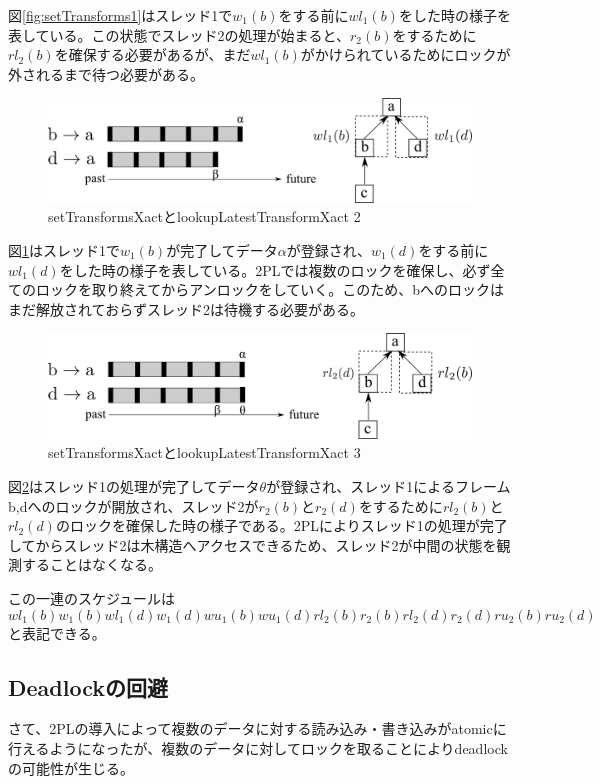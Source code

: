 \documentclass[a4paper]{jreport}	%
\begin{document}
図\ref{fig:setTransforms1}はスレッド1で$w_1(b)$をする前に$wl_1(b)$をした時の様子を表している。この状態でスレッド2の処理が始まると、$r_2(b)$をするために$rl_2(b)$を確保する必要があるが、まだ$wl_1(b)$がかけられているためにロックが外されるまで待つ必要がある。

\begin{figure}[h] 
\centering
\includegraphics[width=12cm]{setTransforms2}
\caption{setTransformsXactとlookupLatestTransformXact 2}
\label{fig:setTransforms2}
\end{figure}

図\ref{fig:setTransforms2}はスレッド1で$w_1(b)$が完了してデータ$\alpha$が登録され、$w_1(d)$をする前に$wl_1(d)$をした時の様子を表している。2PLでは複数のロックを確保し、必ず全てのロックを取り終えてからアンロックをしていく。このため、bへのロックはまだ解放されておらずスレッド2は待機する必要がある。


\begin{figure}[h] 
\centering
\includegraphics[width=12cm]{setTransforms3}
\caption{setTransformsXactとlookupLatestTransformXact 3}
\label{fig:setTransforms3}
\end{figure}


図\ref{fig:setTransforms3}はスレッド1の処理が完了してデータ$\theta$が登録され、スレッド1によるフレームb,dへのロックが開放され、スレッド2が$r_2(b)$と$r_2(d)$をするために$rl_2(b)$と$rl_2(d)$のロックを確保した時の様子である。2PLによりスレッド1の処理が完了してからスレッド2は木構造へアクセスできるため、スレッド2が中間の状態を観測することはなくなる。

この一連のスケジュールは
\begin{equation}
	wl_1(b)w_1(b)wl_1(d)w_1(d)wu_1(b)wu_1(d)rl_2(b)r_2(b)rl_2(d)r_2(d)ru_2(b)ru_2(d)
\end{equation}
と表記できる。

\subsection{Deadlockの回避}
さて、2PLの導入によって複数のデータに対する読み込み・書き込みがatomicに行えるようになったが、複数のデータに対してロックを取ることによりdeadlockの可能性が生じる。
\end{document}
